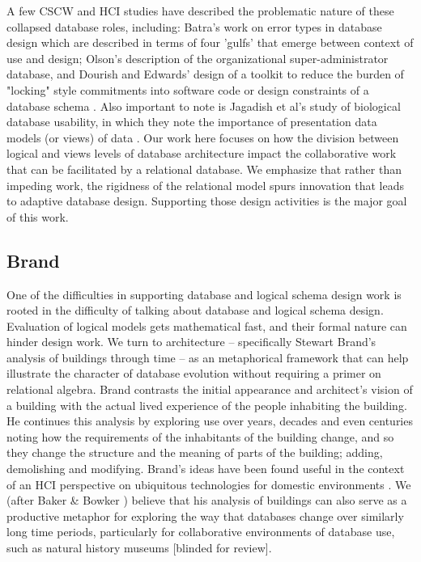 A few CSCW and HCI studies have described the problematic nature of these collapsed database roles, including: Batra's work on error types in database design \cite{Batra_1993} which are described in terms of  four 'gulfs' that emerge between context of use and design; Olson's description of the organizational super-administrator \cite{olson2010database} database, and Dourish and Edwards' design of a toolkit to reduce the burden of "locking" style commitments into software code or design constraints of a database schema \cite{Dourish_2000}. Also important to note is Jagadish et al's study of biological database usability, in which they note the importance of presentation data models (or views) of data \cite{jagadish2007making}. Our work here focuses on how the division between logical and views levels of database architecture impact the collaborative work that can be facilitated by a relational database. We emphasize that rather than impeding work, the rigidness of the relational model spurs innovation that leads to adaptive database design. Supporting those design activities is the major goal of this work. 

\subsection{Brand}

One of the difficulties in supporting database and logical schema design work is rooted in the difficulty of talking about database and logical schema design. Evaluation of logical models gets mathematical fast, and their formal nature can hinder design work. We turn to architecture -- specifically Stewart Brand’s analysis of buildings through time \cite{brand1995buildings} -- as an metaphorical framework that can help illustrate the character of database evolution without requiring a primer on relational algebra. Brand contrasts the initial appearance and architect’s vision of a building with the actual lived experience of the people inhabiting the building. He continues this analysis by exploring use over years, decades and even centuries noting how the requirements of the inhabitants of the building change, and so they change the structure and the meaning of parts of the building; adding, demolishing and modifying. Brand’s ideas have been found useful in the context of an HCI perspective on ubiquitous technologies for domestic environments \cite{rodden2003evolution}. We (after Baker \& Bowker \cite{1}) believe that his analysis of buildings can also serve as a productive metaphor for exploring the way that databases change over similarly long time periods, particularly for collaborative environments of database use, such as natural history museums [blinded for review]. 

